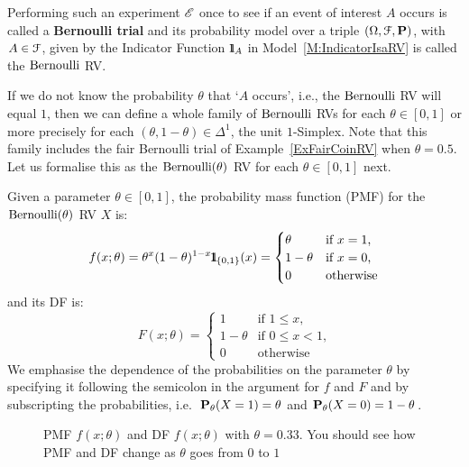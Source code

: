 Performing such an experiment $\mathscr{E}$ once to see if an event of interest $A$ occurs is called a {\bf Bernoulli trial} and its probability model over a triple $(\Omega,\mathcal{F},\mathbf{P})$, with $A \in \mathcal{F}$, given by  the Indicator Function ${1}\mspace{-11 mu}{1}_A$ in Model~\ref{M:IndicatorIsaRV} is called the $\mbox{{\rm Bernoulli}}$ RV. 

If we do not know the probability $\theta$ that `$A$ occurs', i.e., the $\mbox{{\rm Bernoulli}}$ RV will equal $1$, then we can define a whole family of $\mbox{{\rm Bernoulli}}$ RVs for each 
$\theta \in [0,1]$ or more precisely for each $(\theta, 1-\theta) \in \Delta^1$, the unit $1$-Simplex.
Note that this family includes the fair Bernoulli trial of Example~\ref{ExFairCoinRV} when $\theta=0.5$. Let us formalise this as the $\mbox{{\rm Bernoulli}}(\theta)$ RV for each $\theta \in [0,1]$ next.

\begin{model}
Given a parameter $\theta \in [0,1]$, the probability mass function (PMF) for the $\mbox{{\rm Bernoulli}}(\theta)$ RV $X$ is:
\begin{equation}\label{E:Bernoullipdf}
f(x;\theta)= \theta^x (1-\theta)^{1-x} {1}\mspace{-11 mu}{1}_{\{0,1\}}(x) =
\begin{cases}
\theta & \text{if $x=1$,}\\
1-\theta & \text{if $x=0$,}\\
0 & \text{otherwise}
\end{cases}
\end{equation}
and its DF is:
\begin{equation}
F(x;\theta) =
\begin{cases}
1 & \text{if $1 \leq x$,}\\
1-\theta & \text{if $0 \leq x < 1$,}\\
0 & \text{otherwise}
\end{cases}
\end{equation}
We emphasise the dependence of the probabilities on the parameter $\theta$ by specifying it following the semicolon in the argument for $f$ and $F$ and by subscripting the probabilities, i.e.~$\mathbf{P}_{\theta}(X=1)=\theta$ and $\mathbf{P}_{\theta}(X=0)=1-\theta$.
\end{model}
\begin{figure}[htpb]
\centering   {}
\caption{PMF $f(x;\theta)$ and DF $f(x;\theta)$ with $\theta = 0.33$. You should see how PMF and DF change as $\theta$ goes from $0$ to $1$}
\end{figure}


